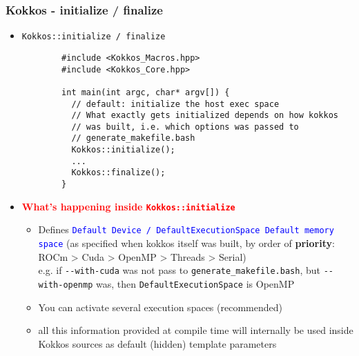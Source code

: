 \begin{frame}[fragile=singleslide]
  \frametitle{Kokkos - initialize / finalize}

  \begin{itemize}
  \item \texttt{Kokkos::initialize / finalize}
    {\small\begin{verbatim}
        #include <Kokkos_Macros.hpp>
        #include <Kokkos_Core.hpp>

        int main(int argc, char* argv[]) {
          // default: initialize the host exec space
          // What exactly gets initialized depends on how kokkos
          // was built, i.e. which options was passed to
          // generate_makefile.bash
          Kokkos::initialize();
          ...
          Kokkos::finalize();
        }
      \end{verbatim}
    }
  \item \textcolor{red}{\textbf{What's happening inside \texttt{Kokkos::initialize}}}
    \begin{itemize}
    \item Defines \textcolor{blue}{\texttt{Default Device / DefaultExecutionSpace Default memory space}} (as specified when kokkos itself was built, by order of {\bf priority}: ROCm > Cuda > OpenMP > Threads > Serial)\\
      e.g. if \texttt{\--\--with-cuda} was not pass to \texttt{generate\_makefile.bash}, but \texttt{\--\--with-openmp} was, then \texttt{DefaultExecutionSpace} is OpenMP
    \item You can activate several execution spaces (recommended)
    \item all this information provided at compile time will internally be used inside Kokkos sources as default (hidden) template parameters
    \end{itemize}
  \end{itemize}
\end{frame}

